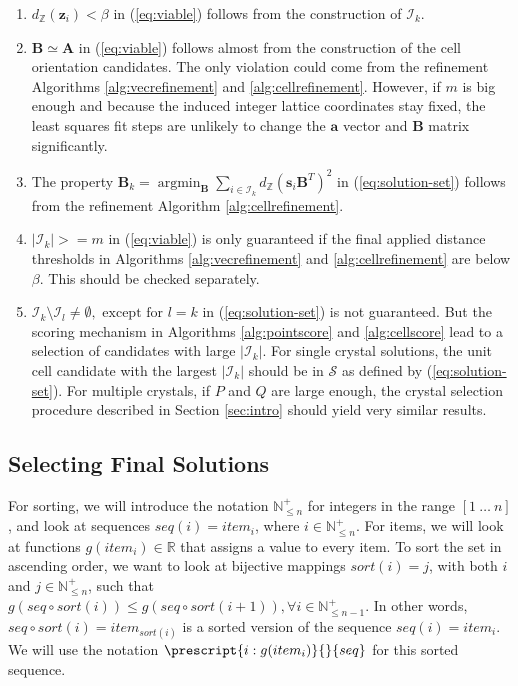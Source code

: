 \documentclass[a4paper,10pt]{article}
\DeclareMathOperator*{\argmin}{argmin}
\newcommand{\vect}[1]{\mathbf{#1}}
\newcommand{\mat}[1]{\mathbf{#1}}
\newcommand{\distZ}[1]{d_\mathbb{Z}(#1)}
\begin{document}
\begin{enumerate}
 \item $\distZ{\vect{z}_i} < \beta$ in (\ref{eq:viable}) follows from the construction of $\mathcal{I}_k$.
 \item $\mat{B} \simeq \mat{A}$ in (\ref{eq:viable}) follows almost from the construction of the cell orientation candidates. The only violation could come from the refinement Algorithms \ref{alg:vecrefinement} and \ref{alg:cellrefinement}. However, if $m$ is big enough and because the induced integer lattice coordinates stay fixed, the least squares fit steps are unlikely to change the $\vect{a}$ vector and $\mat{B}$ matrix significantly.
 \item The property $\mat{B}_k = \argmin_{\mat{B}} \sum_{i\in \mathcal{I}_k} \distZ{\vect{s}_i\mat{B}^T}^2$ in (\ref{eq:solution-set}) follows from the refinement Algorithm \ref{alg:cellrefinement}.
 \item $|\mathcal{I}_k| >= m$ in (\ref{eq:viable}) is only guaranteed if the final applied distance thresholds in Algorithms \ref{alg:vecrefinement} and \ref{alg:cellrefinement} are below $\beta$. This should be checked separately.
 \item $\mathcal{I}_k \setminus \mathcal{I}_l \neq \emptyset,\text{ except for }l=k$ in (\ref{eq:solution-set}) is not guaranteed. But the scoring mechanism in Algorithms \ref{alg:pointscore} and \ref{alg:cellscore} lead to a selection of candidates with large $|\mathcal{I}_k|$. For single crystal solutions, the unit cell candidate with the largest $|\mathcal{I}_k|$ should be in $\mathcal{S}$ as defined by (\ref{eq:solution-set}). For multiple crystals, if $P$ and $Q$ are large enough, the crystal selection procedure described in Section \ref{sec:intro} should yield very similar results.
\end{enumerate}

\subsection{Selecting Final Solutions}\label{subsec:selection}

For sorting, we will introduce the notation $\mathbb{N}_{\leq n}^+$ for integers in the range $[1\:\hdots\:n]$, and look at sequences $seq(i) = item_i$, where $i\in \mathbb{N}_{\leq n}^+$. For items, we will look at functions $g(item_i)\in \mathbb{R}$ that assigns a value to every item. To sort the set in ascending order, we want to look at bijective mappings $sort(i)=j$, with both $i$ and $j\in \mathbb{N}_{\leq n}^+$, such that $g(seq\circ sort(i))\leq g(seq\circ sort(i+1)), \forall i\in \mathbb{N}_{\leq n-1}^+$. In other words, $seq\circ sort(i)=item_{sort(i)}$ is a sorted version of the sequence $seq(i)=item_i$. We will use the notation $\prescript{i:g(item_i)}{}{seq}$ for this sorted sequence.
\end{document}
